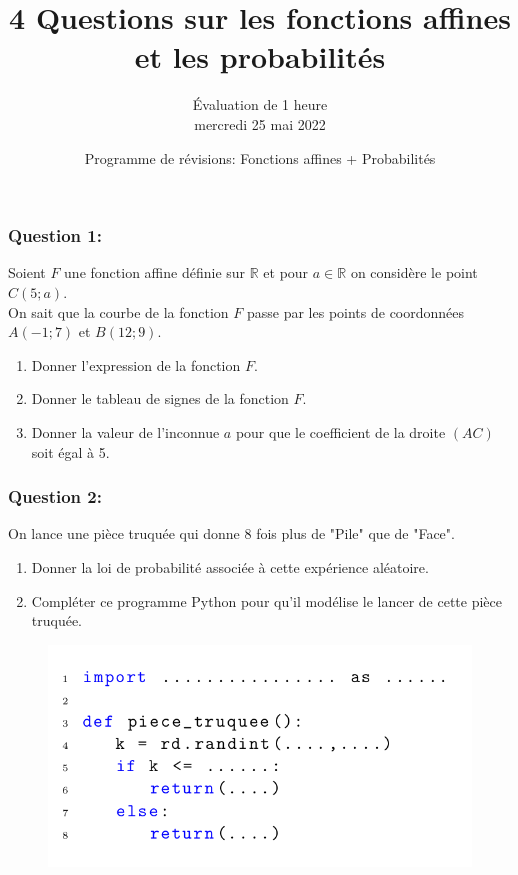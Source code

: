 \documentclass[t,12pt]{beamer}
\title{ 4 Questions sur les fonctions affines et les probabilités}
\author{Évaluation de 1 heure \\mercredi 25 mai 2022}
\date{Programme de révisions: Fonctions affines + Probabilités}
\newcommand{\R}{\mathbb{R}}
\begin{document}
	\maketitle	
\begin{frame}
	
	\frametitle{Question 1: }
Soient $F$ une fonction affine définie sur $\R$ et pour $a\in\R$ on considère le point $C\left(5;a\right)$.\hfill\\[0.3cm]

On sait que la courbe de la fonction $F$ passe par les points de coordonnées $A(-1;7)$ et $B(12;9)$. \hfill\\[0.3cm]
\begin{enumerate}
	\item Donner l'expression de la fonction $F$.
	\item Donner le tableau de signes de la fonction $F$.
	\item Donner la valeur de l'inconnue $a$ pour que le coefficient de la droite $\left(AC\right)$ soit égal à 5. 
\end{enumerate}
		

	

\end{frame}

\begin{frame}
	\frametitle{Question 2: }
		On lance une pièce truquée qui donne 8 fois plus de "Pile" que de "Face". 
		\begin{enumerate}
			\item Donner la loi de probabilité associée à cette expérience aléatoire.
			\item Compléter ce programme Python pour qu'il modélise le lancer de cette pièce truquée.  
		\end{enumerate}
	\begin{figure}
		\includegraphics[scale=0.4]{1.png}
	\end{figure}
	



\end{frame}
\end{document}
